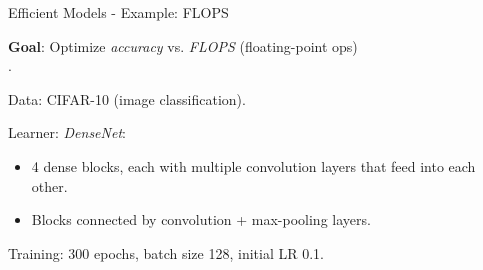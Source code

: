 \documentclass[11pt,compress,t,notes=noshow,xcolor=table]{beamer}
\begin{document}
\begin{vbframe}{Efficient Models - Example: FLOPS}

\textbf{Goal}: Optimize \emph{accuracy} vs. \emph{FLOPS} (floating-point ops) \\
.

\bigskip
Data: CIFAR-10 (image classification).

\bigskip
Learner: \emph{DenseNet}:
\begin{itemize}
  \item 4 dense blocks, each with multiple convolution layers that feed into each other.
  \item Blocks connected by convolution + max-pooling layers.
\end{itemize}

Training: 300 epochs, batch size 128, initial LR 0.1.

\end{vbframe}
\end{document}
